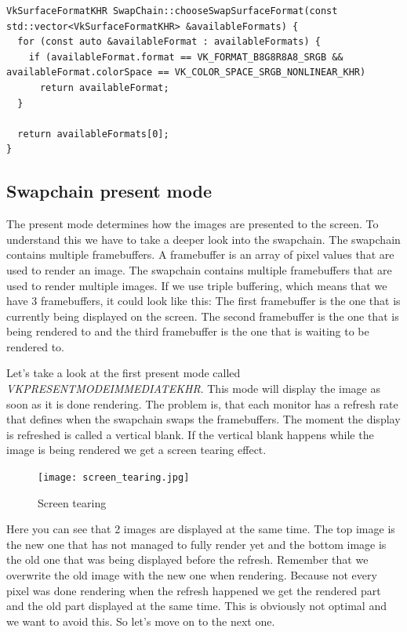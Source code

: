 \documentclass[12pt]{report} \usepackage{preamble}
\begin{document}
\begin{lstlisting}[Language=C++]
VkSurfaceFormatKHR SwapChain::chooseSwapSurfaceFormat(const std::vector<VkSurfaceFormatKHR> &availableFormats) {
  for (const auto &availableFormat : availableFormats) {
    if (availableFormat.format == VK_FORMAT_B8G8R8A8_SRGB && availableFormat.colorSpace == VK_COLOR_SPACE_SRGB_NONLINEAR_KHR)
      return availableFormat;
  }

  return availableFormats[0];
}
\end{lstlisting}

\subsection{Swapchain present mode}

The present mode determines how the images are presented to the screen. To understand this we
have to take a deeper look into the swapchain. The swapchain contains multiple framebuffers.
A framebuffer is an array of pixel values that are used to render an image. The swapchain
contains multiple framebuffers that are used to render multiple images.
If we use triple buffering, which means that we have 3 framebuffers, it could look like this:
The first framebuffer is the one that is currently being displayed on the screen.
The second framebuffer is the one
that is being rendered to and the third framebuffer is the one that is waiting to be rendered to.

Let's take a look at the first present mode called \\
\textit{VK\textunderscore PRESENT\textunderscore MODE\textunderscore IMMEDIATE\textunderscore KHR}.
This mode will display the image as soon as it is done rendering.
The problem is, that each monitor has a refresh rate that defines when the swapchain
swaps the framebuffers. The moment the display is refreshed is called a vertical blank.
If the vertical blank happens while the image is being rendered we get a screen tearing effect.

\begin{figure}[htbp]
	\centering
	\texttt{[image: screen\_tearing.jpg]}
	\caption{Screen tearing} \cite{fig:screen_tearing}
\end{figure}

Here you can see that 2 images are displayed at the same time. The top image is the new one that has
not managed to fully render yet and the bottom image is the old one that was being displayed before the
refresh. Remember that we overwrite the old image with the new one when rendering. Because not every pixel
was done rendering when the refresh happened we get the rendered part and the old part displayed at the same time.
This is obviously not optimal and we want to avoid this. So let's move on to the next one.
\end{document}
